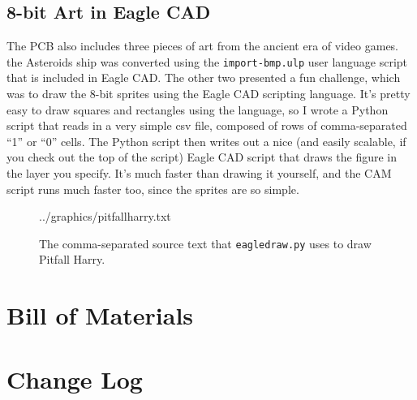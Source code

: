 \documentclass[12pt]{article}
\newcommand{\+}{\item}		%
\begin{document}
\clearpage
\newpage

\subsection{8-bit Art in Eagle CAD}

The PCB also includes three pieces of art from the ancient era of video games. the Asteroids ship was converted using the \texttt{import-bmp.ulp} user language script that is included in Eagle CAD. The other two presented a fun challenge, which was to draw the 8-bit sprites using the Eagle CAD scripting language. It's pretty easy to draw squares and rectangles using the language, so I wrote a Python script that reads in a very simple csv file, composed of rows of comma-separated ``1'' or ``0'' cells. The Python script then writes out a nice (and easily scalable, if you check out the top of the script) Eagle CAD script that draws the figure in the layer you specify. It's much faster than drawing it yourself, and the CAM script runs much faster too, since the sprites are so simple.


\begin{figure}[h!]
\begin{minipage}{3.5in}

 {../graphics/pitfallharry.txt}
\end{minipage}
\caption{The comma-separated source text that \texttt{eagledraw.py} uses to draw Pitfall Harry.}
\label{fig:pitfallharry}

\end{figure}


\clearpage
\newpage

\else
	\newpage
\fi


\begin{table}
\section*{Bill of Materials}

\end{table}

\clearpage

\section{Change Log}
\end{document}
